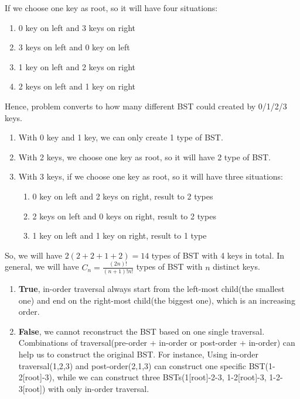 \documentclass[11pt,largemargins]{homework}
\begin{document}
\question
If we choose one key as root, so it will have four situations:
\begin{enumerate}
  \item 0 key on left and 3 keys on right
  \item 3 keys on left and 0 key on left
  \item 1 key on left and 2 keys on right
  \item 2 keys on left and 1 key on right
\end{enumerate}

Hence, problem converts to how many different BST could created by 0/1/2/3 keys.

\begin{enumerate}
  \item With 0 key and 1 key, we can only create 1 type of BST.
  \item With 2 keys, we choose one key as root, so it will have 2 type of BST.
  \item With 3 keys, if we choose one key as root, so it will have three situations:
    \begin{enumerate}
      \item 0 key on left and 2 keys on right, result to 2 types
      \item 2 keys on left and 0 keys on right, result to 2 types
      \item 1 key on left and 1 key on right, result to 1 type
    \end{enumerate}
\end{enumerate}

So, we will have $2(2+2+1+2)=14$ types of BST with 4 keys in total. In general, we will have $C_{n}=\frac{(2n)!}{(n+1)!n!}$ types of BST with $n$ distinct keys.


\question
\begin{enumerate}
  \item \textbf{True}, in-order traversal always start from the left-most child(the smallest one) and end on the right-most child(the biggest one), which is an increasing order.
  \item \textbf{False}, we cannot reconstruct the BST based on one single traversal. Combinations of traversal(pre-order + in-order or post-order + in-order) can help us to construct the original BST. For instance, Using in-order traversal(1,2,3) and post-order(2,1,3) can construct one specific BST(1-2[root]-3), while we can construct three BSTs(1[root]-2-3, 1-2[root]-3, 1-2-3[root]) with only in-order traversal.
\end{enumerate}
\end{document}
